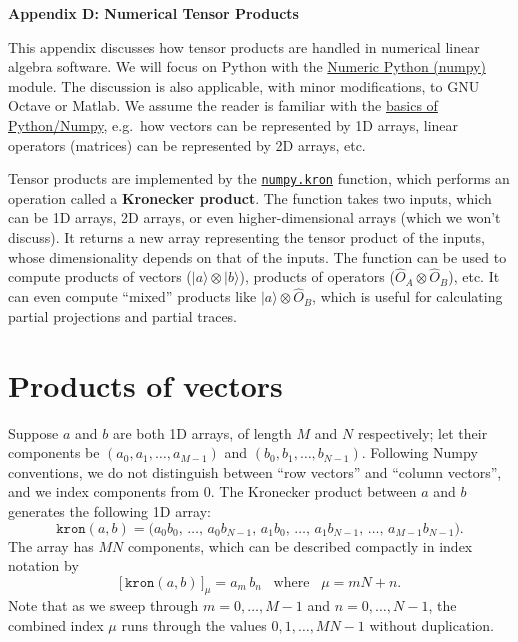 \documentclass[pra,12pt]{revtex4}
\begin{document}
\begin{center}
{\large \textbf{Appendix D: Numerical Tensor Products}}
\end{center}

\noindent
This appendix discusses how tensor products are handled in numerical
linear algebra software.  We will focus on Python with the
\href{https://numpy.org/}{Numeric Python (numpy)} module.  The
discussion is also applicable, with minor modifications, to GNU Octave
or Matlab.  We assume the reader is familiar with the
\href{https://docs.scipy.org/doc/numpy/user/quickstart.html}{basics of
  Python/Numpy}, e.g.~how vectors can be represented by 1D arrays,
linear operators (matrices) can be represented by 2D arrays, etc.

Tensor products are implemented by the
\href{https://docs.scipy.org/doc/numpy/reference/generated/numpy.kron.html}{\texttt{numpy.kron}}
function, which performs an operation called a \textbf{Kronecker
  product}.  The function takes two inputs, which can be 1D arrays, 2D
arrays, or even higher-dimensional arrays (which we won't discuss).
It returns a new array representing the tensor product of the inputs,
whose dimensionality depends on that of the inputs.  The function can
be used to compute products of vectors ($|a\rangle\otimes|b\rangle$),
products of operators ($\hat{O}_A\otimes \hat{O}_B$), etc.  It can
even compute ``mixed'' products like $|a\rangle\otimes\hat{O}_B$,
which is useful for calculating partial projections and partial
traces.

\section{Products of vectors}

Suppose $a$ and $b$ are both 1D arrays, of length $M$ and $N$
respectively; let their components be $(a_0, a_1, \dots, a_{M-1})$ and
$(b_0, b_1, \dots, b_{N-1})$.  Following Numpy conventions, we do not
distinguish between ``row vectors'' and ``column vectors'', and we
index components from 0.  The Kronecker product between $a$ and $b$
generates the following 1D array:
\begin{equation}
  \texttt{kron}(a, b) = \Big(a_0b_0,\,\dots,\, a_0 b_{N-1},\, a_1 b_0,\, \dots,\, a_1 b_{N-1},\, \dots,\, a_{M-1}b_{N-1}\Big).
\end{equation}
The array has $MN$ components, which can be described compactly in
index notation by
\begin{equation}
  \big[\, \texttt{kron}(a, b) \,\big]_{\mu} = a_m \, b_n \;\;\;\mathrm{where}\;\;\;\mu = mN+n.
  \label{kronab}
\end{equation}
Note that as we sweep through $m = 0,\dots,M-1$ and $n = 0,\dots,N-1$,
the combined index $\mu$ runs through the values $0,1,\dots,MN-1$
without duplication.
\end{document}

